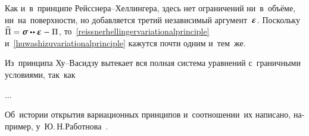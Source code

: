 \begin{otherlanguage}{russian}
Как и~в~принципе Рейсснера\hbox{--}Хеллингера, здесь нет ограничений ни~в~объёме, ни~на~поверхности, но добавляется третий независимый аргумент~$\infinitesimaldeformation$.
Поскольку ${\widehat{\potential} = \linearstress \dotdotp \infinitesimaldeformation - \potential}$, то~\eqref{reissnerhellingervariationalprinciple} и~\eqref{huwashizuvariationalprinciple} кажутся почти одним и~тем~же.

Из~принципа Ху\hbox{--}Васидзу вытекает вся полная система уравнений с~граничными условиями, так~как

...


Об~истории открытия вариационных принципов и~соотношении~их написано, например, у~Ю.\,Н.\;Работнова~\cite{rabotnov-mechanicsofdeformable}.

\end{otherlanguage}



